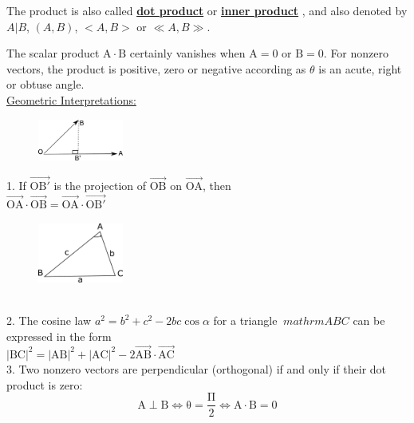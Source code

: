 \documentclass[12]{article}
\begin{document}
The product is also called \textbf {\underline{dot product}} or \textbf { \underline {inner product} }, and also denoted by $ A | B $, $ ( A , B )$, $< A , B >$ or $ \ll A,B \gg $.

The scalar product $ \mathrm{A} \cdot \mathrm{B} $ certainly vanishes when $\mathrm{A} = 0 $ or $\mathrm{B} = 0 $. For nonzero vectors, the product is positive, zero or negative according as $\theta$ is an acute, right or obtuse angle. \\


\underline{Geometric Interpretations:} \\

\begin{figure}
	\centering
\includegraphics[width=0.25\textwidth]{drawing1}
\end{figure}
 
1.  If $ \mathrm{ \vec{{OB'}}} $ is the projection of $ \mathrm{ \vec{OB} } $ on $ \mathrm{ \vec{OA} }$, then\\

$ \mathrm{ \vec{OA} \cdot \vec{OB} } = \mathrm{ \vec{OA} \cdot \vec{OB'} } $\\
\begin{figure}
	\centering
\includegraphics[width=0.25\textwidth]{drawing2}
\end{figure}\\


2.  The cosine law $ a^2 = b^2 + c^2 - 2bc \cos \alpha $ for a triangle $\ mathrm{ABC} $ can be expressed in the form\\

$ \mathrm{ |BC|^2 = |AB|^2 + |AC|^2 - 2 \vec{AB} \cdot \vec{AC} } $ \\


3.  Two nonzero vectors are perpendicular (orthogonal) if and only if their dot product is zero: \\
$$ \mathrm{ A \perp B \iff \theta = 
									\frac
									{\Pi}{2}
						\iff A \cdot B = 0 }$$
\end{document}
